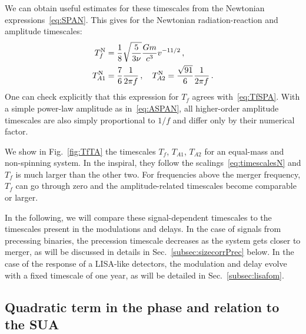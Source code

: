 \documentclass[aps,showpacs,twocolumn,
prd,superscriptaddress,nofootinbib]{revtex4-1}
\newcommand{\Tf}{T_{f}}
\begin{document}
We can obtain useful estimates for these timescales from the Newtonian expressions~\eqref{eq:SPAN}. This gives for the Newtonian radiation-reaction and amplitude timescales:
\begin{subequations}\label{eq:timescalesN}
\begin{align}
	\Tf^{\rm N} &= \frac{1}{8} \sqrt{\frac{5}{3\nu}} \frac{G m}{c^{3}} v^{-11/2} \,, \label{eq:TfN}\\
	T_{A1}^{\rm N} &= \frac{7}{6} \frac{1}{2\pi f}\,, \quad T_{A2}^{\rm N} = \frac{\sqrt{91}}{6} \frac{1}{2\pi f} \,. \label{eq:TA1N-TA2N}
\end{align}
\end{subequations}
One can check explicitly that this expression for $\Tf$ agrees with~\eqref{eq:TfSPA}. With a simple power-law amplitude as in~\eqref{eq:ASPAN}, all higher-order amplitude timescales are also simply proportional to $1/f$ and differ only by their numerical factor.

We show in Fig.~\ref{fig:TfTA} the timescales $\Tf$, $T_{A1}$, $T_{A2}$ for an equal-mass and non-spinning system. In the inspiral, they follow the scalings~\eqref{eq:timescalesN} and $\Tf$ is much larger than the other two. For frequencies above the merger frequency, $\Tf$ can go through zero and the amplitude-related timescales become comparable or larger.

In the following, we will compare these signal-dependent timescales to the timescales present in the modulations and delays. In the case of signals from precessing binaries, the precession timescale decreases as the system gets closer to merger, as will be discussed in details in Sec.~\ref{subsec:sizecorrPrec} below. In the case of the response of a LISA-like detectors, the modulation and delay evolve with a fixed timescale of one year, as will be detailed in Sec.~\ref{subsec:lisafom}.


\subsection{Quadratic term in the phase and relation to the SUA}
\label{subsec:resumquadphase}
\end{document}
